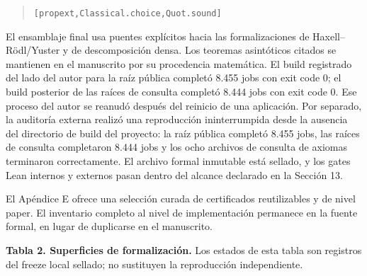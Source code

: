 \documentclass[spanish,11pt,a4paper]{article}
\begin{document}
\begin{quote}
{\LeanSymbols\fontsize{8}{10}\selectfont
\noindent \nolinkurl{[propext,}\hspace{0.45em}\nolinkurl{Classical.choice,}\hspace{0.45em}\nolinkurl{Quot.sound]}\par
}
\end{quote}

El ensamblaje final usa puentes explícitos hacia las formalizaciones de
Haxell--Rödl/Yuster y de descomposición densa. Los teoremas asintóticos
citados se mantienen en el manuscrito por su procedencia matemática. El
build registrado del lado del autor para la raíz pública completó 8.455
jobs con exit code 0; el build posterior de las raíces de consulta
completó 8.444 jobs con exit code 0. Ese proceso del autor se reanudó
después del reinicio de una aplicación. Por separado, la auditoría
externa realizó una reproducción ininterrumpida desde la ausencia del
directorio de build del proyecto: la raíz pública completó 8.455 jobs,
las raíces de consulta completaron 8.444 jobs y los ocho archivos de
consulta de axiomas terminaron correctamente. El archivo formal
inmutable está sellado, y los gates Lean internos y externos pasan
dentro del alcance declarado en la Sección 13.

El Apéndice E ofrece una selección curada de certificados reutilizables
y de nivel paper. El inventario completo al nivel de implementación
permanece en la fuente formal, en lugar de duplicarse en el manuscrito.

\textbf{Tabla 2. Superficies de formalización.} Los estados de esta
tabla son registros del freeze local sellado; no sustituyen la
reproducción independiente.
\end{document}
